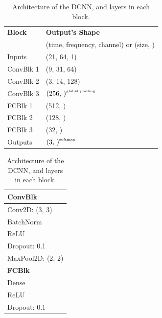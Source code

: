 \documentclass[a4paper]{article}
\begin{document}
\begin{table}[t]
  \caption{Architecture of the DCNN, and layers in each block.}
  \centering
  \begin{tabular}{ll}
    \toprule
    \textbf{Block}    & \textbf{Output's Shape}                         \\
                      & \tiny{(time, frequency, channel) or (size, )}   \\ \midrule
    Inputs            & (21, 64, 1)                                     \\ \midrule
    ConvBlk 1         & (9, 31, 64)                                     \\
    ConvBlk 2         & (3, 14, 128)                                    \\
    ConvBlk 3         & $\text{(256, )}^{\text{\tiny{global pooling}}}$ \\ \midrule
    FCBlk 1           & (512, )                                         \\
    FCBlk 2           & (128, )                                         \\
    FCBlk 3           & (32, )                                          \\ \midrule
    Outputs           & $\text{(3, )}^{\text{\tiny{softmax}}}$          \\
    \bottomrule
  \end{tabular}
  \begin{footnotesize}
    \begin{tabular}{l}
      \toprule
      \textbf{ConvBlk}   \\ \midrule
      Conv2D: (3, 3)     \\
      BatchNorm          \\
      ReLU               \\
      Dropout:  0.1      \\
      MaxPool2D: (2, 2)  \\
      \bottomrule
      \toprule
      \textbf{FCBlk}     \\ \midrule
      Dense              \\
      ReLU               \\
      Dropout:  0.1      \\
      \bottomrule
    \end{tabular}
  \end{footnotesize}
  \label{tbl:dcnn-arch}
  \vspace*{-\baselineskip}
\end{table}
\end{document}
